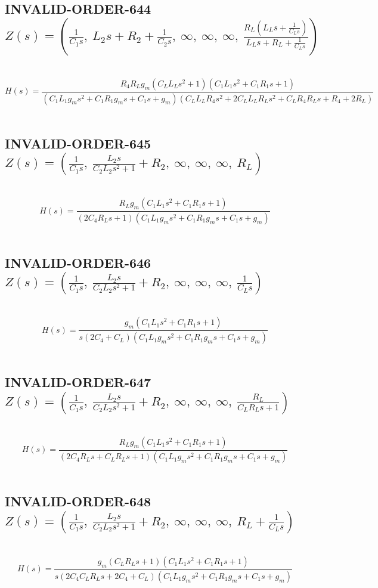 \documentclass{article}
\begin{document}
\subsection{INVALID-ORDER-644 $Z(s) = \left( \frac{1}{C_{1} s}, \  L_{2} s + R_{2} + \frac{1}{C_{2} s}, \  \infty, \  \infty, \  \infty, \  \frac{R_{L} \left(L_{L} s + \frac{1}{C_{L} s}\right)}{L_{L} s + R_{L} + \frac{1}{C_{L} s}}\right)$ } \ 
\textbf{\[H(s) = \frac{R_{4} R_{L} g_{m} \left(C_{L} L_{L} s^{2} + 1\right) \left(C_{1} L_{1} s^{2} + C_{1} R_{1} s + 1\right)}{\left(C_{1} L_{1} g_{m} s^{2} + C_{1} R_{1} g_{m} s + C_{1} s + g_{m}\right) \left(C_{L} L_{L} R_{4} s^{2} + 2 C_{L} L_{L} R_{L} s^{2} + C_{L} R_{4} R_{L} s + R_{4} + 2 R_{L}\right)}\] } \ 
\subsection{INVALID-ORDER-645 $Z(s) = \left( \frac{1}{C_{1} s}, \  \frac{L_{2} s}{C_{2} L_{2} s^{2} + 1} + R_{2}, \  \infty, \  \infty, \  \infty, \  R_{L}\right)$ } \ 
\textbf{\[H(s) = \frac{R_{L} g_{m} \left(C_{1} L_{1} s^{2} + C_{1} R_{1} s + 1\right)}{\left(2 C_{4} R_{L} s + 1\right) \left(C_{1} L_{1} g_{m} s^{2} + C_{1} R_{1} g_{m} s + C_{1} s + g_{m}\right)}\] } \ 
\subsection{INVALID-ORDER-646 $Z(s) = \left( \frac{1}{C_{1} s}, \  \frac{L_{2} s}{C_{2} L_{2} s^{2} + 1} + R_{2}, \  \infty, \  \infty, \  \infty, \  \frac{1}{C_{L} s}\right)$ } \ 
\textbf{\[H(s) = \frac{g_{m} \left(C_{1} L_{1} s^{2} + C_{1} R_{1} s + 1\right)}{s \left(2 C_{4} + C_{L}\right) \left(C_{1} L_{1} g_{m} s^{2} + C_{1} R_{1} g_{m} s + C_{1} s + g_{m}\right)}\] } \ 
\subsection{INVALID-ORDER-647 $Z(s) = \left( \frac{1}{C_{1} s}, \  \frac{L_{2} s}{C_{2} L_{2} s^{2} + 1} + R_{2}, \  \infty, \  \infty, \  \infty, \  \frac{R_{L}}{C_{L} R_{L} s + 1}\right)$ } \ 
\textbf{\[H(s) = \frac{R_{L} g_{m} \left(C_{1} L_{1} s^{2} + C_{1} R_{1} s + 1\right)}{\left(2 C_{4} R_{L} s + C_{L} R_{L} s + 1\right) \left(C_{1} L_{1} g_{m} s^{2} + C_{1} R_{1} g_{m} s + C_{1} s + g_{m}\right)}\] } \ 
\subsection{INVALID-ORDER-648 $Z(s) = \left( \frac{1}{C_{1} s}, \  \frac{L_{2} s}{C_{2} L_{2} s^{2} + 1} + R_{2}, \  \infty, \  \infty, \  \infty, \  R_{L} + \frac{1}{C_{L} s}\right)$ } \ 
\textbf{\[H(s) = \frac{g_{m} \left(C_{L} R_{L} s + 1\right) \left(C_{1} L_{1} s^{2} + C_{1} R_{1} s + 1\right)}{s \left(2 C_{4} C_{L} R_{L} s + 2 C_{4} + C_{L}\right) \left(C_{1} L_{1} g_{m} s^{2} + C_{1} R_{1} g_{m} s + C_{1} s + g_{m}\right)}\] } \ 
\end{document}
